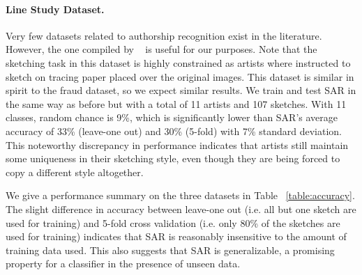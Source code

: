 


\vspace{-2mm}
\paragraph{Line Study Dataset.} Very few datasets related to authorship recognition exist in the literature. However, the one compiled by ~\cite{Cole:2008:PDL:1360612.1360687} is useful for our purposes. Note that the sketching task in this dataset is highly constrained as artists where instructed to sketch on tracing paper placed over the original images. This dataset is similar in spirit to the fraud dataset, so we expect similar results. We train and test SAR in the same way as before but with a total of 11 artists and 107 sketches. With 11 classes, random chance is 9\%, which is significantly lower than SAR's average accuracy of 33\% (leave-one out) and 30\% (5-fold) with 7\% standard deviation. This noteworthy discrepancy in performance indicates that artists still maintain some uniqueness in their sketching style, even though they are being forced to copy a different style altogether.

We give a performance summary on the three datasets in Table ~\ref{table:accuracy}. The slight difference in accuracy between leave-one out (i.e. all but one sketch are used for training) and 5-fold cross validation (i.e. only 80\% of the sketches are used for training) indicates that SAR is reasonably insensitive to the amount of training data used. This also suggests that SAR is generalizable, a promising property for a classifier in the presence of unseen data.


